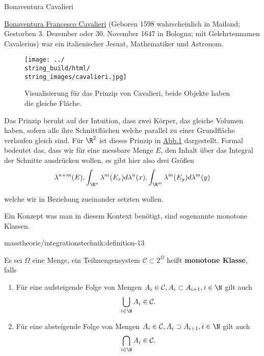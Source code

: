 \documentclass[letterpaper,10pt,german]{jupyterBook}
\begin{document}
\begin{emphBox}{Bonaventura Cavalieri}{}

\par
\href{https://de.wikipedia.org/wiki/Bonaventura\_Cavalieri}{Bonaventura Francesco Cavalieri} (Geboren 1598 wahrscheinlich in Mailand; Gestorben 3. Dezember oder 30. November 1647 in Bologna; mit Gelehrtennamen Cavalerius) war ein italienischer Jesuat, Mathematiker und Astronom.
\end{emphBox}

\begin{figure}[htbp]
\centering


\noindent\texttt{[image: ../\\string\_build/html/\\string\_images/cavalieri.jpg]}
\caption{Visualisierung für das Prinzip von Cavalieri, beide Objekte haben die gleiche Fläche.}\label{\detokenize{masstheorie/integrationstechnik:fig-cavalieri}}\end{figure}

\par
Das Prinzip beruht auf der Intuition, dass zwei Körper, das gleiche Volumen haben, sofern alle ihre Schnittflächen welche parallel zu einer Grundfläche verlaufen gleich sind. Für \(\R^2\) ist dieses Prinzip in \hyperref[\detokenize{masstheorie/integrationstechnik:fig-cavalieri}]{Abb.\@ \ref{\detokenize{masstheorie/integrationstechnik:fig-cavalieri}}} dargestellt. Formal bedeutet das, dass wir für eine messbare Menge \(E\), den Inhalt über das Integral der Schnitte ausdrücken wollen, es gibt hier also drei Größen
\begin{align*}
\lambda^{n+m}(E), \int_{\R^n} \lambda^m(E_x) d\lambda^n(x), \int_{\R^m} \lambda^m(E_y) d\lambda^m(y)
\end{align*}
\par
welche wir in Beziehung zueinander setzten wollen.

\par
Ein Konzept was man in diesem Kontext benötigt, sind sogenannte monotone Klassen.
\begin{definition}{}{masstheorie/integrationstechnik:definition-13}



\par
Es sei \(\Omega\) eine Menge, ein Teilmengensystem \(\mathcal{C}\subset 2^\Omega\) heißt \textbf{monotone Klasse}, falls
\begin{enumerate}

\item {} 
\par
Für eine aufsteigende Folge von Mengen \(A_i\in\mathcal{C}, A_i\subset A_{i+1}, i\in\N\) gilt auch
\begin{align*}
\bigcup_{i\in\N} A_i\in\mathcal{C}.
\end{align*}
\item {} 
\par
Für eine absteigende Folge von Mengen \(A_i\in\mathcal{C}, A_i\supset A_{i+1}, i\in\N\) gilt auch
\begin{align*}
\bigcap_{i\in\N} A_i\in\mathcal{C}.
\end{align*}
\end{enumerate}
\end{definition}
\end{document}
